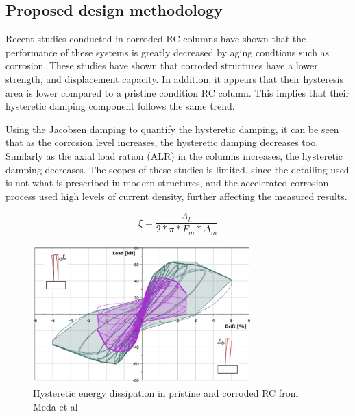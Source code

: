 \subsection{Proposed design methodology}

Recent studies conducted in corroded RC columns have shown that the performance of these systems is greatly decreased by aging condtions such as corrosion. These studies have shown that corroded structures have a lower strength, and displacement capacity. In addition, it appears that their hysteresis area is lower compared to a pristine condition RC column. This implies that their hysteretic damping component follows the same trend. 

Using the Jacobsen damping to quantify the hysteretic damping, it can be seen that as the corrosion level increases, the hysteretic damping decreases too. Similarly as the axial load ration (ALR) in the columns increases, the hysteretic damping decreases. The scopes of these studies is limited, since the detailing used is not what is prescribed in modern structures, and the accelerated corrosion process used high levels of current density, further affecting the measured results. 

\begin{equation}
    \xi=\frac{A_h}{2*\pi*F_m*\Delta_m}
    \label{eq:JacobsenEquation}
\end{equation}

\begin{figure}[htbp]
	\centering
    \includegraphics[width=0.75\textwidth]{VAC Prelim 2.0/Chapter-5/figs/Meda_HystereticArea_01.png}
	\caption{Hysteretic energy dissipation in pristine and corroded RC from Meda et al \cite{Meda2014}}
	\label{fig:DDBD_sum}
\end{figure}

